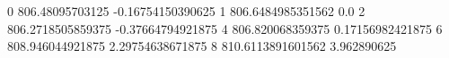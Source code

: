 0 806.48095703125 -0.16754150390625
1 806.6484985351562 0.0
2 806.2718505859375 -0.37664794921875
4 806.820068359375 0.17156982421875
6 808.946044921875 2.29754638671875
8 810.6113891601562 3.962890625
